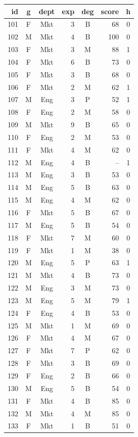 \documentclass[11pt,a4paper]{article}
\begin{document}
\begin{center}
\hfill
\begin{tabular}[t]{@{}r c c r c r c@{}}
\toprule
id & g & dept & exp & deg & score & h \\
\midrule
101 & F & Mkt & 3 & B & 68 & 0 \\
102 & M & Mkt & 4 & B & 100 & 0 \\
103 & F & Mkt & 3 & M & 88 & 1 \\
104 & F & Mkt & 6 & B & 73 & 0 \\
105 & F & Mkt & 3 & B & 68 & 0 \\
106 & F & Mkt & 2 & M & 62 & 1 \\
107 & M & Eng & 3 & P & 52 & 1 \\
108 & F & Eng & 2 & M & 58 & 0 \\
109 & M & Mkt & 9 & B & 65 & 0 \\
110 & F & Eng & 2 & M & 53 & 0 \\
111 & F & Mkt & 4 & M & 62 & 0 \\
112 & M & Eng & 4 & B & -- & 1 \\
113 & M & Eng & 3 & B & 53 & 0 \\
114 & M & Eng & 5 & B & 63 & 0 \\
115 & M & Eng & 4 & M & 62 & 0 \\
116 & F & Mkt & 5 & B & 67 & 0 \\
117 & M & Eng & 5 & B & 54 & 0 \\
118 & F & Mkt & 7 & M & 60 & 0 \\
119 & F & Mkt & 1 & M & 38 & 0 \\
120 & M & Eng & 5 & P & 63 & 1 \\
121 & M & Mkt & 4 & B & 73 & 0 \\
122 & M & Eng & 3 & M & 73 & 0 \\
123 & M & Eng & 5 & M & 79 & 1 \\
124 & F & Eng & 4 & B & 53 & 0 \\
125 & M & Mkt & 1 & M & 69 & 0 \\
126 & F & Mkt & 4 & M & 67 & 0 \\
127 & F & Mkt & 7 & P & 62 & 0 \\
128 & F & Mkt & 3 & B & 69 & 0 \\
129 & F & Eng & 2 & B & 66 & 0 \\
130 & M & Eng & 5 & B & 54 & 0 \\
131 & F & Mkt & 4 & B & 85 & 0 \\
132 & M & Mkt & 4 & M & 85 & 0 \\
133 & F & Mkt & 1 & B & 51 & 0 \\

\end{tabular}
\end{center}
\end{document}
